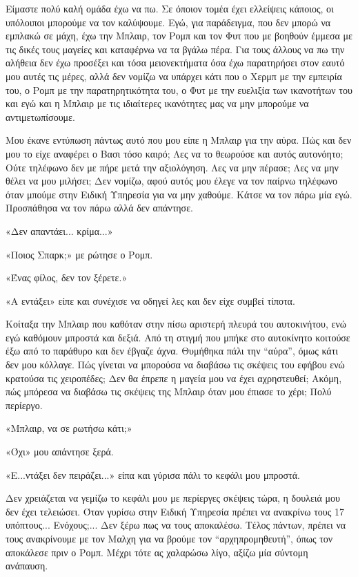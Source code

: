 \documentclass[12pt,twoside, openany]{book}
\begin{document}
Είμαστε πολύ καλή ομάδα έχω να πω. Σε όποιον τομέα έχει ελλείψεις κάποιος, οι υπόλοιποι μπορούμε να τον καλύψουμε. Εγώ, για παράδειγμα, που δεν μπορώ να εμπλακώ σε μάχη, έχω την Μπλαιρ, τον Ρομπ και τον Φυτ που με βοηθούν έμμεσα με τις δικές τους μαγείες και καταφέρνω να τα βγάλω πέρα. Για τους άλλους να πω την αλήθεια δεν έχω προσέξει και τόσα μειονεκτήματα όσα έχω παρατηρήσει στον εαυτό μου αυτές τις μέρες, αλλά δεν νομίζω να υπάρχει κάτι που ο Χερμπ με την εμπειρία του, ο Ρομπ με την παρατηρητικότητα του, ο Φυτ με την ευελιξία των ικανοτήτων του και εγώ και η Μπλαιρ με τις ιδιαίτερες ικανότητες μας να μην μπορούμε να αντιμετωπίσουμε.

Μου έκανε εντύπωση πάντως αυτό που μου είπε η Μπλαιρ για την αύρα. Πώς και δεν μου το είχε αναφέρει ο Βασι τόσο καιρό; Λες να το θεωρούσε και αυτός αυτονόητο; Ούτε τηλέφωνο δεν με πήρε μετά την αξιολόγηση. Λες να μην πέρασε; Λες να μην θέλει να μου μιλήσει; Δεν νομίζω, αφού αυτός μου έλεγε να τον παίρνω τηλέφωνο όταν μπούμε στην Ειδική Υπηρεσία για να μην χαθούμε. Κάτσε να τον πάρω μία εγώ. Προσπάθησα να τον πάρω αλλά δεν απάντησε.

«Δεν απαντάει... κρίμα...»

«Ποιος Σπαρκ;» με ρώτησε ο Ρομπ.

«Ένας φίλος, δεν τον ξέρετε.»

«Α εντάξει» είπε και συνέχισε να οδηγεί λες και δεν είχε συμβεί τίποτα.

Κοίταξα την Μπλαιρ που καθόταν στην πίσω αριστερή πλευρά του αυτοκινήτου, ενώ εγώ καθόμουν μπροστά και δεξιά. Από τη στιγμή που μπήκε στο αυτοκίνητο κοιτούσε έξω από το παράθυρο και δεν έβγαζε άχνα. Θυμήθηκα πάλι την “αύρα”, όμως κάτι δεν μου κόλλαγε. Πώς γίνεται να μπορούσα να διαβάσω τις σκέψεις του εφήβου ενώ κρατούσα τις χειροπέδες; Δεν θα έπρεπε η μαγεία μου να έχει αχρηστευθεί; Ακόμη, πώς μπόρεσα να διαβάσω τις σκέψεις της Μπλαιρ όταν μου έπιασε το χέρι; Πολύ περίεργο.

«Μπλαιρ, να σε ρωτήσω κάτι;»

«Όχι» μου απάντησε ξερά.

«Ε...ντάξει δεν πειράζει...» είπα και γύρισα πάλι το κεφάλι μου μπροστά. 

Δεν χρειάζεται να γεμίζω το κεφάλι μου με περίεργες σκέψεις τώρα, η δουλειά μου δεν έχει τελειώσει. Όταν γυρίσω στην Ειδική Υπηρεσία πρέπει να ανακρίνω τους 17 υπόπτους... Ενόχους;... Δεν ξέρω πως να τους αποκαλέσω. Τέλος πάντων, πρέπει να τους ανακρίνουμε με τον Μαλχη για να βρούμε τον “αρχηπρομηθευτή”, όπως τον αποκάλεσε πριν ο Ρομπ. Μέχρι τότε ας χαλαρώσω λίγο, αξίζω μία σύντομη ανάπαυση.
\end{document}
